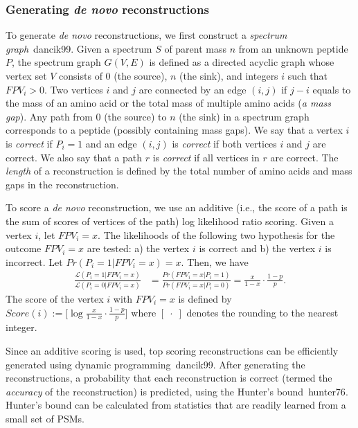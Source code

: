 \subsubsection{Generating {\em de novo} reconstructions} 

To generate {\em de novo} reconstructions, we first construct a {\em spectrum graph}~\cite{unv}{dancik99}. Given a spectrum $S$ of parent mass $n$ from an unknown peptide $P$, the spectrum graph $G(V,E)$ is defined as a directed acyclic graph whose vertex set $V$ consists of $0$ (the source), $n$ (the sink), and integers $i$ such that $FPV_i>0$. Two vertices $i$ and $j$ are connected by an edge $(i,j)$ if $j-i$ equals to the mass of an amino acid or the total mass of multiple amino acids ({\em a mass gap}). Any path from $0$ (the source) to $n$ (the sink) in a spectrum graph corresponds to a peptide (possibly containing mass gaps). We say that a vertex $i$ is {\em correct} if $P_i=1$ and an edge $(i,j)$ is {\em correct} if both vertices $i$ and $j$ are correct. We also say that a path $r$ is {\em correct} if all vertices in $r$ are correct.  The {\em length} of a reconstruction is defined by the total number of amino acids and  mass gaps in the reconstruction. 


To score a {\em de novo} reconstruction, we use an additive (i.e., the score of a path is the sum of scores of vertices of the path) log likelihood ratio scoring.
 Given a vertex $i$, let $FPV_i=x$. The likelihoods of the following two hypothesis for the outcome $FPV_i=x$ are tested: a) the vertex $i$ is correct and b) the vertex $i$ is incorrect. Let $Pr(P_i=1|FPV_i=x) = x$. Then, we have
\begin{align}
\frac{\mathcal{L}(P_i=1|FPV_i=x)}{\mathcal{L}(P_i=0|FPV_i=x)}&=\frac{Pr(FPV_i=x|P_i=1)}{Pr(FPV_i=x|P_i=0)}=\frac{x}{1-x}\cdot\frac{1-p}{p}.
\end{align}
The score of the vertex $i$ with $FPV_i=x$ is defined by $Score(i):=\Big[\log\frac{x}{1-x}\cdot\frac{1-p}{p} \Big]$ where $[\;\cdot\;]$ denotes the rounding to the nearest integer. 

Since an additive scoring is used, top scoring reconstructions can be efficiently generated using dynamic programming~\cite{unv}{dancik99}. After generating the reconstructions, a probability that each reconstruction is correct (termed the {\em accuracy} of the reconstruction) is predicted, using the Hunter's bound~\cite{unv}{hunter76}. 
Hunter's bound can be calculated from 
statistics that are readily learned from a small set of PSMs.

